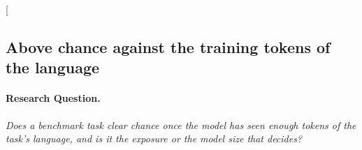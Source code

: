 \clearpage
\twocolumn[{%
\rqparent
\subsection{Above chance against the training tokens of the language}
\label{app:rq00_chance_vs_train_tokens}

\noindent\begin{minipage}[t]{0.485\textwidth}
\vspace{0pt}
\paragraph{Research Question.} \emph{Does a benchmark task clear chance once the model has seen enough tokens of the task's language, and is it the exposure or the model size that decides?}


\end{minipage}}

